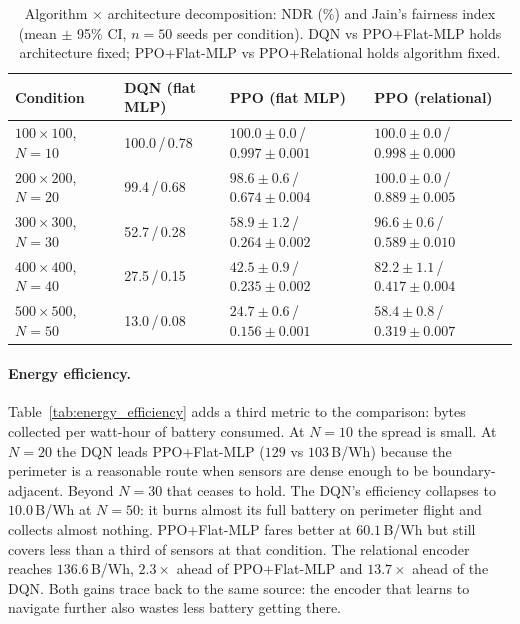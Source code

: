 \begin{table}[H]
\centering
\caption{Algorithm $\times$ architecture decomposition: NDR (\%) and Jain's fairness index (mean $\pm$ 95\% CI, $n{=}50$ seeds per condition). DQN vs PPO+Flat-MLP holds architecture fixed; PPO+Flat-MLP vs PPO+Relational holds algorithm fixed.}
\label{tab:arch_algo_decomp}
\small
\begin{tabularx}{\textwidth}{l X X X}
\toprule
\textbf{Condition} & \textbf{DQN (flat MLP)} & \textbf{PPO (flat MLP)} & \textbf{PPO (relational)} \\
\midrule
$100{\times}100$, $N{=}10$ & 100.0\,/\,0.78 & $100.0{\pm}0.0$\,/\,$0.997{\pm}0.001$ & $100.0{\pm}0.0$\,/\,$0.998{\pm}0.000$ \\
$200{\times}200$, $N{=}20$ & 99.4\,/\,0.68  & $98.6{\pm}0.6$\,/\,$0.674{\pm}0.004$  & $100.0{\pm}0.0$\,/\,$0.889{\pm}0.005$ \\
$300{\times}300$, $N{=}30$ & 52.7\,/\,0.28  & $58.9{\pm}1.2$\,/\,$0.264{\pm}0.002$  & $96.6{\pm}0.6$\,/\,$0.589{\pm}0.010$  \\
$400{\times}400$, $N{=}40$ & 27.5\,/\,0.15  & $42.5{\pm}0.9$\,/\,$0.235{\pm}0.002$  & $82.2{\pm}1.1$\,/\,$0.417{\pm}0.004$  \\
$500{\times}500$, $N{=}50$ & 13.0\,/\,0.08  & $24.7{\pm}0.6$\,/\,$0.156{\pm}0.001$  & $58.4{\pm}0.8$\,/\,$0.319{\pm}0.007$  \\
\bottomrule
\end{tabularx}
\end{table}

\paragraph{Energy efficiency.}
Table~\ref{tab:energy_efficiency} adds a third metric to the comparison: bytes collected per watt-hour of battery consumed. At $N{=}10$ the spread is small. At $N{=}20$ the DQN leads PPO+Flat-MLP ($129$ vs $103$\,B/Wh) because the perimeter is a reasonable route when sensors are dense enough to be boundary-adjacent. Beyond $N{=}30$ that ceases to hold. The DQN's efficiency collapses to $10.0$\,B/Wh at $N{=}50$: it burns almost its full battery on perimeter flight and collects almost nothing. PPO+Flat-MLP fares better at $60.1$\,B/Wh but still covers less than a third of sensors at that condition. The relational encoder reaches $136.6$\,B/Wh, $2.3{\times}$ ahead of PPO+Flat-MLP and $13.7{\times}$ ahead of the DQN. Both gains trace back to the same source: the encoder that learns to navigate further also wastes less battery getting there.

